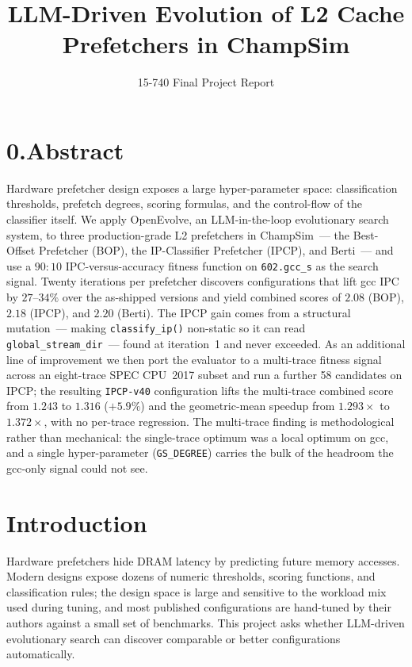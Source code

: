 \documentclass[11pt]{article}
\title{\vspace{-2em}LLM-Driven Evolution of L2 Cache Prefetchers in ChampSim}
\author{15-740 Final Project Report}
\date{}
\begin{document}
\maketitle
\vspace{-3em}

\section*{0.\quad Abstract}

Hardware prefetcher design exposes a large hyper-parameter space:
classification thresholds, prefetch degrees, scoring formulas, and the
control-flow of the classifier itself. We apply OpenEvolve, an
LLM-in-the-loop evolutionary search system, to three production-grade L2
prefetchers in ChampSim~--- the Best-Offset Prefetcher (BOP), the
IP-Classifier Prefetcher (IPCP), and Berti~--- and use a $90{:}10$
IPC-versus-accuracy fitness function on \texttt{602.gcc\_s} as the
search signal. Twenty iterations per prefetcher discovers configurations
that lift gcc IPC by $27$--$34\%$ over the as-shipped versions and yield
combined scores of $2.08$ (BOP), $2.18$ (IPCP), and $2.20$ (Berti). The
IPCP gain comes from a structural mutation~--- making
\texttt{classify\_ip()} non-static so it can read
\texttt{global\_stream\_dir}~--- found at iteration~1 and never
exceeded. As an additional line of improvement we then port the
evaluator to a multi-trace fitness signal across an eight-trace SPEC
CPU~2017 subset and run a further 58 candidates on IPCP; the resulting
\texttt{IPCP-v40} configuration lifts the multi-trace combined score
from $1.243$ to $1.316$ ($+5.9\%$) and the geometric-mean speedup from
$1.293\times$ to $1.372\times$, with no per-trace regression. The
multi-trace finding is methodological rather than mechanical: the
single-trace optimum was a local optimum on gcc, and a single
hyper-parameter (\texttt{GS\_DEGREE}) carries the bulk of the headroom
the gcc-only signal could not see.

\section{Introduction}

Hardware prefetchers hide DRAM latency by predicting future memory
accesses. Modern designs expose dozens of numeric thresholds, scoring
functions, and classification rules; the design space is large and
sensitive to the workload mix used during tuning, and most published
configurations are hand-tuned by their authors against a small set of
benchmarks. This project asks whether LLM-driven evolutionary search can
discover comparable or better configurations automatically.
\end{document}
